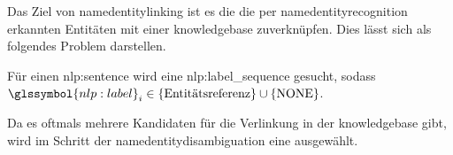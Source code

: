 \subsubsection{}
Das Ziel von \gls{namedentitylinking} ist es
die die per \gls{namedentityrecognition} erkannten Entitäten
mit einer \gls{knowledgebase} zuverknüpfen.
Dies lässt sich als folgendes Problem darstellen.

\begin{prob}\label{prob:nlp:nel}
	Für einen \gls{nlp:sentence} 
	wird eine \gls{nlp:label_sequence}  gesucht,
	sodass \(
	\glssymbol{nlp:label}_i \in
	\left\lbrace
	\text{Entitätsreferenz}
	\right\rbrace
	\cup
	\left\lbrace
	\text{NONE}
	\right\rbrace
	\).
\end{prob}

Da es oftmals mehrere Kandidaten  für die Verlinkung in der \gls{knowledgebase} gibt,
wird im Schritt der \gls{namedentitydisambiguation} eine ausgewählt.